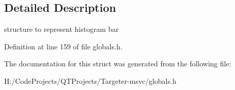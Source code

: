 \subsection{Detailed Description}
structure to represent histogram bar 

Definition at line 159 of file globals.\+h.



The documentation for this struct was generated from the following file\+:\begin{DoxyCompactItemize}
\item 
H\+:/\+Code\+Projects/\+Q\+T\+Projects/\+Targeter-\/msvc/globals.\+h\end{DoxyCompactItemize}
